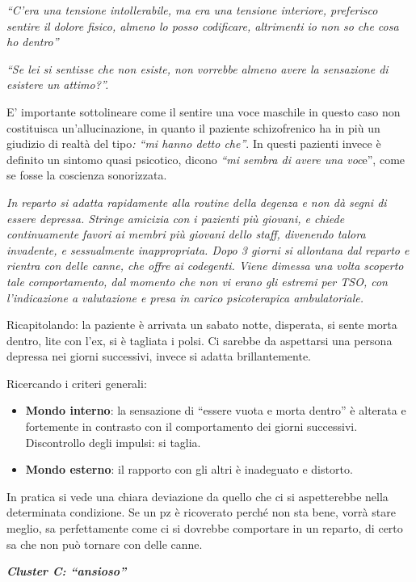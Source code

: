 \documentclass[]{article}
\begin{document}
\emph{``C'era una tensione intollerabile, ma era una tensione interiore,
preferisco sentire il dolore fisico, almeno lo posso codificare,
altrimenti io non so che cosa ho dentro''}

\emph{``Se lei si sentisse che non esiste, non vorrebbe almeno avere la
sensazione di esistere un attimo?''.}

E' importante sottolineare come il sentire una voce maschile in questo
caso non costituisca un'allucinazione, in quanto il paziente
schizofrenico ha in più un giudizio di realtà del tipo\emph{: ``mi hanno
detto che''}. In questi pazienti invece è definito un sintomo quasi
psicotico, dicono \emph{``mi sembra di avere una voc}e'', come se fosse
la coscienza sonorizzata.

\emph{In reparto si adatta rapidamente alla routine della degenza e non
dà segni di essere depressa. Stringe amicizia con i pazienti più
giovani, e chiede continuamente favori ai membri più giovani dello
staff, divenendo talora invadente, e sessualmente inappropriata. Dopo 3
giorni si allontana dal reparto e rientra con delle canne, che offre ai
codegenti. Viene dimessa una volta scoperto tale comportamento, dal
momento che non vi erano gli estremi per TSO, con l'indicazione a
valutazione e presa in carico psicoterapica ambulatoriale.}

Ricapitolando: la paziente è arrivata un sabato notte, disperata, si
sente morta dentro, lite con l'ex, si è tagliata i polsi. Ci sarebbe da
aspettarsi una persona depressa nei giorni successivi, invece si adatta
brillantemente.

Ricercando i criteri generali:

\begin{itemize}
\item
  \textbf{Mondo interno}: la sensazione di ``essere vuota e morta
  dentro'' è alterata e fortemente in contrasto con il comportamento dei
  giorni successivi. Discontrollo degli impulsi: si taglia.
\item
  \textbf{Mondo esterno}: il rapporto con gli altri è inadeguato e
  distorto.
\end{itemize}

In pratica si vede una chiara deviazione da quello che ci si
aspetterebbe nella determinata condizione. Se un pz è ricoverato perché
non sta bene, vorrà stare meglio, sa perfettamente come ci si dovrebbe
comportare in un reparto, di certo sa che non può tornare con delle
canne.

\textbf{\emph{Cluster C: ``ansioso''}}
\end{document}
